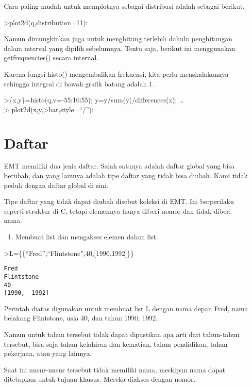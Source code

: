 \documentclass[
]{book}
\providecommand{\tightlist}{%
  \setlength{\itemsep}{0pt}\setlength{\parskip}{0pt}}
\begin{document}
Cara paling mudah untuk memplotnya sebagai distribusi adalah sebagai berikut.

\textgreater plot2d(q,distribution=11):

Namun dimungkinkan juga untuk menghitung terlebih dahulu penghitungan dalam interval yang dipilih sebelumnya. Tentu saja, berikut ini menggunakan getfrequencies() secara internal.

Karena fungsi histo() mengembalikan frekuensi, kita perlu menskalakannya sehingga integral di bawah grafik batang adalah 1.

\textgreater\{x,y\}=histo(q,v=-55:10:55); y=y/sum(y)/differences(x); \ldots{}\\
\textgreater{} plot2d(x,y,\textgreater bar,style=``/''):

\chapter{Daftar}\label{daftar}

EMT memiliki dua jenis daftar. Salah satunya adalah daftar global yang bisa berubah, dan yang lainnya adalah tipe daftar yang tidak bisa diubah. Kami tidak peduli dengan daftar global di sini.

Tipe daftar yang tidak dapat diubah disebut koleksi di EMT. Ini berperilaku seperti struktur di C, tetapi elemennya hanya diberi nomor dan tidak diberi nama.

\begin{enumerate}
\def\labelenumi{\arabic{enumi}.}
\tightlist
\item
  Membuat list dan mengakses elemen dalam list
\end{enumerate}

\textgreater L=\{\{``Fred'',``Flintstone'',40,{[}1990,1992{]}\}\}

\begin{verbatim}
Fred
Flintstone
40
[1990,  1992]
\end{verbatim}

Perintah diatas digunakan untuk membuat list L dengan nama depan Fred, nama belakang Flintstone, usia 40, dan tahun 1990, 1992.

Namun untuk tahun tersebut tidak dapat dipastikan apa arti dari tahun-tahun tersebut, bisa saja tahun kelahiran dan kematian, tahun pendidikan, tahun pekerjaan, atau yang lainnya.

Saat ini unsur-unsur tersebut tidak memiliki nama, meskipun nama dapat ditetapkan untuk tujuan khusus. Mereka diakses dengan nomor.
\end{document}
